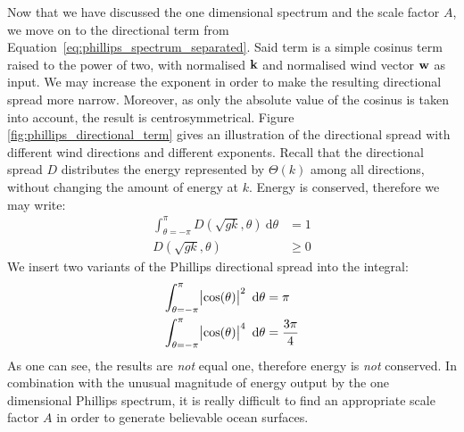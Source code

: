 %

Now that we have discussed the one dimensional \wavenumber spectrum and the 
scale factor $A$, we move on to the directional term from 
Equation~\ref{eq:phillips_spectrum_separated}. Said term is a simple cosinus 
term raised to the power of two, with normalised \wavevector $\mathbf{k}$ and 
normalised wind vector $\mathbf{w}$ as input. We may increase the exponent in 
order to make the resulting directional spread more narrow. Moreover, as only
the  absolute value of the cosinus is taken into account, the result is
centrosymmetrical.
Figure \ref{fig:phillips_directional_term} gives an illustration of the directional 
spread with different wind directions and different exponents. Recall that the 
directional spread $D$ distributes the energy represented by $\Theta(k)$ among 
all directions, without changing the amount of energy at \wavenumber $k$.  
Energy is conserved, therefore we may write:
\begin{subequations}
\begin{align}
\int_{\theta=-\pi}^{\pi}D(\sqrt{gk},\theta)~\mathrm{d}\theta &= 1 \\
D(\sqrt{gk},\theta) &\geq 0
\end{align}
\end{subequations}
We insert two variants of the Phillips directional spread into the integral:
\begin{subequations}
\begin{align}
\int_{\theta=-\pi}^{\pi} \abs{\cos(\theta)}^2~\mathrm{d}\theta &= \pi \\
\int_{\theta=-\pi}^{\pi} \abs{\cos(\theta)}^4~\mathrm{d}\theta &= \frac{3\pi}{4}
\end{align}
\end{subequations}
As one can see, the results are \emph{not} equal one, therefore energy is 
\emph{not} conserved. In combination with the unusual magnitude of energy 
output by the one dimensional Phillips \wavenumber spectrum, it is really 
difficult to find an appropriate scale factor $A$ in order to generate 
believable ocean surfaces.
%
